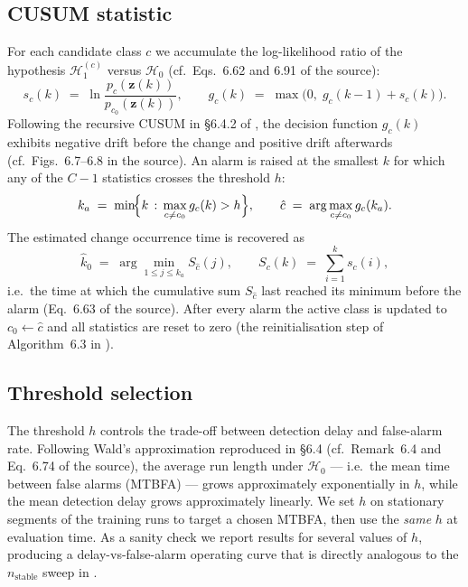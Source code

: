 \subsection{CUSUM statistic}
\label{sec:cusum_statistic}

For each candidate class $c$ we accumulate the log-likelihood ratio of the
hypothesis $\mathcal{H}_1^{(c)}$ versus $\mathcal{H}_0$ (cf.\ Eqs.~6.62 and
6.91 of the source):
\begin{equation}
  s_c(k) \;=\; \ln\frac{p_c\!\left(\mathbf{z}(k)\right)}{p_{c_0}\!\left(\mathbf{z}(k)\right)},
  \qquad
  g_c(k) \;=\; \max\!\bigl(0,\; g_c(k-1) + s_c(k)\bigr).
  \label{eq:cusum_recursion}
\end{equation}
Following the recursive CUSUM in \S6.4.2 of \cite{Blanke2003}, the decision
function $g_c(k)$ exhibits negative drift before the change and positive drift
afterwards (cf.\ Figs.~6.7--6.8 in the source). An alarm is raised at the
smallest $k$ for which any of the $C-1$ statistics crosses the threshold $h$:
\begin{equation}
  k_a \;=\; \min\!\Bigl\{ k \,:\, \max_{c\neq c_0} g_c(k) > h \Bigr\},
  \qquad
  \hat{c} \;=\; \arg\max_{c\neq c_0} g_c(k_a).
  \label{eq:cusum_alarm}
\end{equation}
The estimated change occurrence time is recovered as
\begin{equation}
  \hat{k}_0 \;=\; \arg\min_{1\le j\le k_a} S_{\hat{c}}(j),
  \qquad
  S_c(k) \;=\; \sum_{i=1}^{k} s_c(i),
  \label{eq:cusum_kzero}
\end{equation}
i.e.\ the time at which the cumulative sum $S_{\hat{c}}$ last reached its
minimum before the alarm (Eq.~6.63 of the source). After every alarm the
active class is updated to $c_0\leftarrow\hat{c}$ and all statistics are reset
to zero (the reinitialisation step of Algorithm~6.3 in \cite{Blanke2003}).

\subsection{Threshold selection}
\label{sec:cusum_threshold}

The threshold $h$ controls the trade-off between detection delay and
false-alarm rate. Following Wald's approximation reproduced in \S6.4
(cf.\ Remark~6.4 and Eq.~6.74 of the source), the average run length under
$\mathcal{H}_0$ --- i.e.\ the mean time between false alarms (MTBFA) --- grows
approximately exponentially in $h$, while the mean detection delay grows
approximately linearly. We set $h$ on stationary segments of the training runs
to target a chosen MTBFA, then use the \emph{same} $h$ at evaluation time. As
a sanity check we report results for several values of $h$, producing a
delay-vs-false-alarm operating curve that is directly analogous to the
$n_{\text{stable}}$ sweep in .

